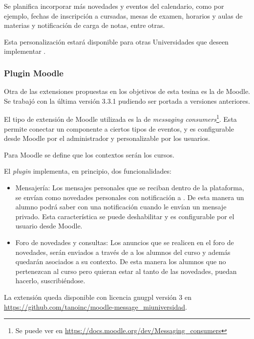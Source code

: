 Se planifica incorporar más novedades y eventos del calendario, como por ejemplo, fechas de inscripción a cursadas, mesas de examen, horarios y aulas de materias y notificación de carga de notas, entre otras.

Esta personalización estará disponible para otras Universidades que deseen implementar \nombreApp{}.

\subsubsection{Plugin Moodle}
\label{desarrollo_plugins_moodle}

Otra de las extensiones propuestas en los objetivos de esta tesina es la de Moodle. Se trabajó con la última versión 3.3.1 pudiendo ser portada a versiones anteriores.

El tipo de extensión de Moodle utilizada es la de \textit{messaging consumers}\footnote{Se puede ver en \url{https://docs.moodle.org/dev/Messaging_consumers}}. Esta permite conectar un componente a ciertos tipos de eventos, y es configurable desde Moodle por el administrador y personalizable por los usuarios.

Para Moodle se define que los contextos serán los cursos.

El \textit{plugin} implementa, en principio, dos funcionalidades:
\begin{itemize}
\item Mensajería: Los mensajes personales que se reciban dentro de la plataforma, se envían como novedades personales con notificación a \nombreApp{}. De esta manera un alumno podrá saber con una notificación cuando le envían un mensaje privado. Esta característica se puede deshabilitar y es configurable por el usuario desde Moodle.
\item Foro de novedades y consultas: Los anuncios que se realicen en el foro de novedades, serán enviados a través de \nombreApp{} a los alumnos del curso y además quedarán asociados a su contexto. De esta manera los alumnos que no pertenezcan al curso pero quieran estar al tanto de las novedades, puedan hacerlo, suscribiéndose.
\end{itemize}


La extensión queda disponible con licencia \gls{gnugpl} versión 3 en \url{https://github.com/tanoinc/moodle-message_miuniversidad}.